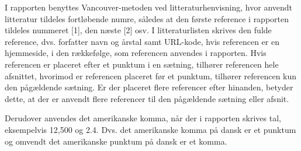 I rapporten benyttes Vancouver-metoden ved litteraturhenvisning, hvor anvendt litteratur tildeles fortløbende numre, således at den første reference i rapporten tildeles nummeret [1], den næste [2] osv. I litteraturlisten skrives den fulde reference, dvs. forfatter navn og årstal samt URL-kode, hvis referencen er en hjemmeside, i den rækkefølge, som referencen anvendes i rapporten. Hvis referencen er placeret efter et punktum i en sætning, tilhører referencen hele afsnittet, hvorimod er referencen placeret før et punktum, tilhører referencen kun den pågældende sætning. Er der placeret flere referencer efter hinanden, betyder dette, at der er anvendt flere referencer til den pågældende sætning eller afsnit. 

Derudover anvendes det amerikanske komma, når der i rapporten skrives tal, eksempelvis 12,500 og 2.4. Dvs. det amerikanske komma på dansk er et punktum og omvendt det amerikanske punktum på dansk er et komma.    

